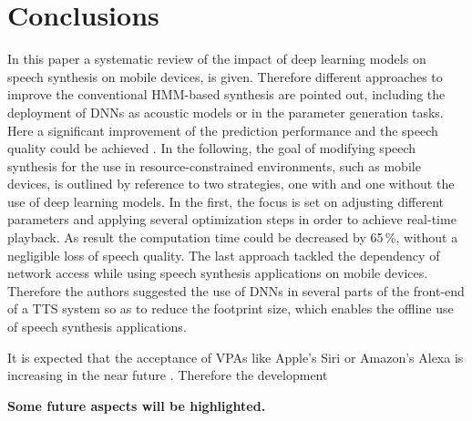 

\section{Conclusions}
\label{sec:conclusion}

In this paper a systematic review of the impact of deep learning models on speech synthesis on mobile devices, is given. Therefore different approaches to improve the conventional \ac{HMM}-based synthesis are pointed out, including the deployment of \acp{DNN} as acoustic models or in the parameter generation tasks. Here a significant improvement of the prediction performance and the speech quality could be achieved \cite{zen:deepstatistical, hashimoto:effect}. In the following, the goal of modifying speech synthesis for the use in resource-constrained environments, such as mobile devices, is outlined by reference to two strategies, one with and one without the use of deep learning models. In the first, the focus is set on adjusting different parameters and applying several optimization steps \cite{toth:optimizing} in order to achieve real-time playback. As result the computation time could be decreased by 65\,\%, without a negligible loss of speech quality. The last approach \cite{boros:robust} tackled the dependency of network access while using speech synthesis applications on mobile devices. Therefore the authors suggested the use of \acp{DNN} in several parts of the front-end of a \ac{TTS} system so as to reduce the footprint size, which enables the offline use of speech synthesis applications.

It is expected that the acceptance of \acp{VPA} like Apple's Siri or Amazon's Alexa is increasing in the near future \cite{gartner:assistants}. Therefore the development

\textbf{\color{ACMRed}Some future aspects will be highlighted.}

\iffalse
\vspace{2em}
See \cite{edinburgh:speech}
\begin{itemize}[leftmargin=10pt]
	\item Voice cloning
	\item Voice reconstruction
	\item Personalised speech-to-speech translation
	\item Articulatory-controllable speech synthesis
\end{itemize}
\fi